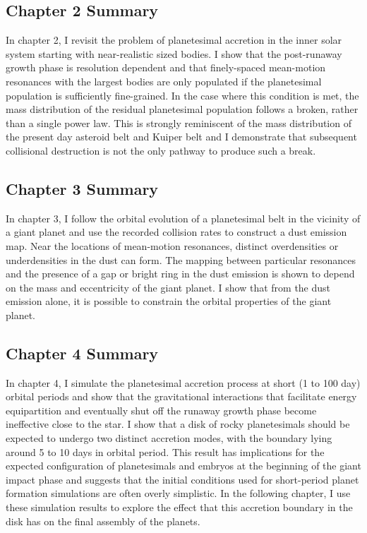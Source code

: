 \subsection{Chapter 2 Summary}

In chapter 2, I revisit the problem of planetesimal accretion in the inner solar system starting with near-realistic sized bodies. I show that the post-runaway growth phase is resolution dependent and that finely-spaced mean-motion resonances with the largest bodies are only populated if the planetesimal population is sufficiently fine-grained. In the case where this condition is met, the mass distribution of the residual planetesimal population follows a broken, rather than a single power law. This is strongly reminiscent of the mass distribution of the present day asteroid belt and Kuiper belt and I demonstrate that subsequent collisional destruction is not the only pathway to produce such a break.

\subsection{Chapter 3 Summary}

In chapter 3, I follow the orbital evolution of a planetesimal belt in the vicinity of a giant planet and use the recorded collision rates to construct a dust emission map. Near the locations of mean-motion resonances, distinct overdensities or underdensities in the dust can form. The mapping between particular resonances and the presence of a gap or bright ring in the dust emission is shown to depend on the mass and eccentricity of the giant planet. I show that from the dust emission alone, it is possible to constrain the orbital properties of the giant planet.

\subsection{Chapter 4 Summary}

In chapter 4, I simulate the planetesimal accretion process at short (1 to 100 day) orbital periods and show that the gravitational interactions that facilitate energy equipartition and eventually shut off the runaway growth phase become ineffective close to the star. I show that a disk of rocky planetesimals should be expected to undergo two distinct accretion modes, with the boundary lying around 5 to 10 days in orbital period. This result has implications for the expected configuration of planetesimals and embryos at the beginning of the giant impact phase and suggests that the initial conditions used for short-period planet formation simulations are often overly simplistic. In the following chapter, I use these simulation results to explore the effect that this accretion boundary in the disk has on the final assembly of the planets.

